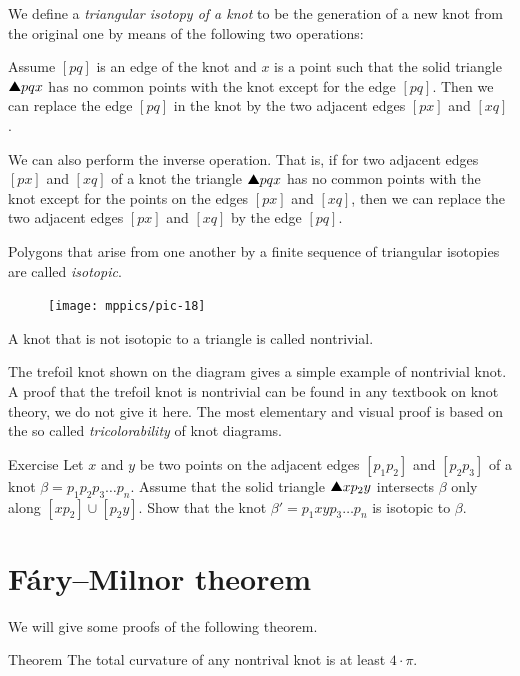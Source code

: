 We define a \emph{triangular isotopy of a knot} to be the generation of a new knot from the original one by means of the
following two operations:

Assume $[pq]$ is an edge of the knot and $x$
is a point such that the solid triangle $\solidtriangle pqx$  has no common points with the knot except for the edge $[pq]$.
Then we can replace the edge $[pq]$ in the knot by the two adjacent edges $[px]$ and $[xq]$.

We can also perform the inverse operation.
That is, if for two adjacent edges $[px]$ and $[xq]$ of a knot the triangle
$\solidtriangle pqx$ has no common points with the knot except for the points on the edges $[px]$ and $[xq]$,
then we can replace the two adjacent edges $[px]$ and $[xq]$ by the edge $[pq]$.

Polygons that arise from one another by a finite sequence of
triangular isotopies are called \emph{isotopic}.

\begin{figure}
\vskip-4mm
\centering
\texttt{[image: mppics/pic-18]}
\vskip0mm
\end{figure}

A knot that is not isotopic to a triangle is called nontrivial.

The trefoil knot shown on the diagram gives a simple example of nontrivial knot.
A proof that the trefoil knot is nontrivial can be found in any textbook on knot theory, we do not give it here.
The most elementary and visual proof is based on the so called \emph{tricolorability} of knot diagrams.   

\begin{thm}{Exercise}\label{ex:triangle-isotopy}
Let $x$ and $y$ be two points on the adjacent edges $[p_1p_2]$ and $[p_2p_3]$ of a knot $\beta=p_1p_2p_3\dots p_n$.
Assume that the solid triangle $\solidtriangle xp_2y$ intersects $\beta$ only along $[xp_2]\cup [p_2y]$.
Show that the knot $\beta'=p_1xyp_3\dots p_n$ is isotopic to $\beta$.
\end{thm}



\section{F\'ary--Milnor theorem}

We will give some proofs of the following theorem.

\begin{thm}{Theorem}\label{thm:fary-milnor}
The total curvature of any nontrival knot is at least $4\cdot\pi$. 
\end{thm}

